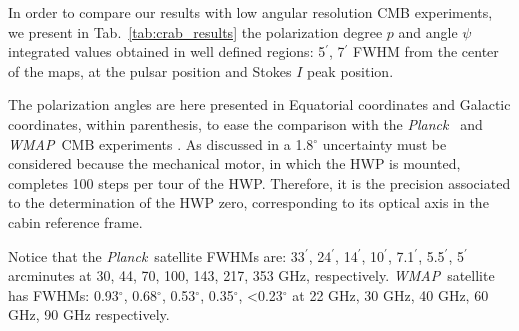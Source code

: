 \documentclass[twocolumn,traditabstract]{aa}
\def\Planck{\textit{Planck}}
\def\WMAP{\textit{WMAP}}
\begin{document}
In order to compare our results with low angular resolution CMB experiments, we present in Tab.~\ref{tab:crab_results} the
polarization degree $p$ and angle $\psi$ integrated values obtained in well
defined regions: 5$^\prime$, 7$^\prime$ FWHM from the center of the maps, at the pulsar position and Stokes $I$ peak position.

The polarization angles are here presented in Equatorial coordinates and Galactic coordinates, within parenthesis, to ease the comparison with the \Planck\ \citep{2015arXiv150702058P} and \WMAP\ CMB experiments \citep{2011ApJS..192...19W}.
As discussed in \cite{ritacco2017} a 1.8$^{\circ}$ uncertainty must be considered because the mechanical motor, in which the HWP is mounted, completes 100 steps per tour of the HWP. Therefore, it is the precision associated to the determination of the HWP zero, corresponding to its optical axis in the cabin reference frame.

Notice that the \Planck\ satellite FWHMs are: 33$^{\prime}$, 24$^{\prime}$, 14$^{\prime}$, 10$^{\prime}$, 7.1$^{\prime}$, 5.5$^{\prime}$, 5$^{\prime}$ arcminutes at 30, 44, 70, 100, 143, 217, 353 GHz, respectively.
\WMAP\ satellite has FWHMs: 0.93$^{\circ}$, 0.68$^{\circ}$, 0.53$^{\circ}$, 0.35$^{\circ}$, \textless 0.23$^{\circ}$ at 22 GHz, 30 GHz, 40 GHz, 60 GHz, 90 GHz respectively. 
\end{document}
